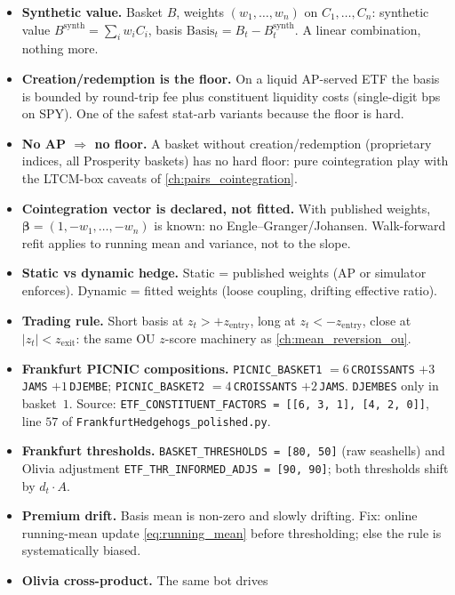 \begin{itemize}
  \item \textbf{Synthetic value.} Basket $B$, weights
  $(w_1, \ldots, w_n)$ on $C_1, \ldots, C_n$: synthetic value
  $B^{\text{synth}} = \sum_i w_i C_i$, basis
  $\text{Basis}_t = B_t - B^{\text{synth}}_t$. A linear
  combination, nothing more.
  \item \textbf{Creation/redemption is the floor.} On a liquid
  AP-served ETF the basis is bounded by round-trip fee plus
  constituent liquidity costs (single-digit bps on SPY). One
  of the safest stat-arb variants because the floor is hard.
  \item \textbf{No AP $\Rightarrow$ no floor.} A basket without
  creation/redemption (proprietary indices, all Prosperity
  baskets) has no hard floor: pure cointegration play with the
  LTCM-box caveats of \cref{ch:pairs_cointegration}.
  \item \textbf{Cointegration vector is declared, not fitted.}
  With published weights, $\bm\beta = (1, -w_1, \ldots, -w_n)$
  is known: no Engle--Granger/Johansen. Walk-forward refit
  applies to running mean and variance, not to the slope.
  \item \textbf{Static vs dynamic hedge.} Static = published
  weights (AP or simulator enforces). Dynamic = fitted weights
  (loose coupling, drifting effective ratio).
  \item \textbf{Trading rule.} Short basis at
  $z_t > +z_{\text{entry}}$, long at $z_t < -z_{\text{entry}}$,
  close at $|z_t| < z_{\text{exit}}$: the same OU $z$-score
  machinery as \cref{ch:mean_reversion_ou}.
  \item \textbf{Frankfurt PICNIC compositions.}
  \texttt{PICNIC\_BASKET1} $= 6$\,\texttt{CROISSANTS} $+
  3$\,\texttt{JAMS} $+ 1$\,\texttt{DJEMBE};
  \texttt{PICNIC\_BASKET2} $= 4$\,\texttt{CROISSANTS} $+
  2$\,\texttt{JAMS}. \texttt{DJEMBES} only in basket~$1$. Source:
  \texttt{ETF\_CONSTITUENT\_FACTORS = [[6, 3, 1], [4, 2, 0]]},
  line $57$ of \texttt{FrankfurtHedgehogs\_polished.py}.
  \item \textbf{Frankfurt thresholds.}
  \texttt{BASKET\_THRESHOLDS = [80, 50]} (raw seashells) and
  Olivia adjustment \texttt{ETF\_THR\_INFORMED\_ADJS = [90, 90]};
  both thresholds shift by $d_t \cdot A$.
  \item \textbf{Premium drift.} Basis mean is non-zero and
  slowly drifting. Fix: online running-mean update
  \eqref{eq:running_mean} before thresholding; else the rule is
  systematically biased.
  \item \textbf{Olivia cross-product.} The same bot drives

\end{itemize}
